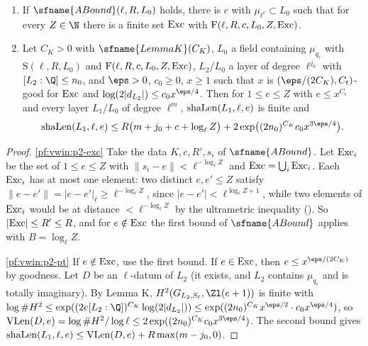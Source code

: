 \begin{lemma}\label{pf:vwin:point2}
\begin{enumerate}[label=(\alph*)]
\item\label{pf:vwin:p2-exc} If $\sfname{ABound}(\ell,R,L_0)$ holds, there is $c$ with $\mu_{\ell^c}\subset L_0$ such that for every
$Z\in\N$ there is a finite set $\mathrm{Exc}$ with $\mathrm{F}(\ell,R,c,L_0,Z,\mathrm{Exc})$.
\item\label{pf:vwin:p2-pt} Let $C_K>0$ with $\sfname{LemmaK}(C_K)$, $L_0$ a field containing $\mu_{q_\ell}$ with
$\mathrm{S}(\ell,R,L_0)$ and $\mathrm{F}(\ell,R,c,L_0,Z,\mathrm{Exc})$, $L_2/L_0$ a layer of degree $\ell^{j_0}$ with $[L_2:\Q]\le n_0$, and
$\eps>0$, $c_0\ge0$, $x\ge1$ such that $x$ is $(\eps/(2C_K),C_t)$-good for $\mathrm{Exc}$ and $\log(2|d_{L_2}|)\le c_0x^{\eps/4}$.
Then for $1\le e\le Z$ with $e\le x^{C_t}$ and every layer $L_1/L_0$ of degree $\ell^m$, $\mathrm{shaLen}(L_1,\ell,e)$ is finite and
\[
 \vwinsh(L_1,\ell,e)\le R\bigl(m+j_0+c+\log_\ell Z\bigr)+2\exp\bigl((2n_0)^{C_K}c_0x^{3\eps/4}\bigr).
\]
\end{enumerate}
\end{lemma}

\begin{proof}
\ref{pf:vwin:p2-exc} Take the data $K,c,R',s_i$ of $\sfname{ABound}$. Let $\mathrm{Exc}_i$ be the set of $1\le e\le Z$ with
$\|s_i-e\|<\ell^{-\log_\ell Z}$ and $\mathrm{Exc}=\bigcup_i\mathrm{Exc}_i$. Each $\mathrm{Exc}_i$ has at most one element: two distinct
$e,e'\le Z$ satisfy $\|e-e'\|=|e-e'|_\ell\ge\ell^{-\log_\ell Z}$, since $|e-e'|<\ell^{\log_\ell Z+1}$, while two elements of
$\mathrm{Exc}_i$ would be at distance $<\ell^{-\log_\ell Z}$ by the ultrametric inequality (). So
$|\mathrm{Exc}|\le R'\le R$, and for $e\notin\mathrm{Exc}$ the first bound of $\sfname{ABound}$ applies with $B=\log_\ell Z$.

\ref{pf:vwin:p2-pt} If $e\notin\mathrm{Exc}$, use the first bound. If $e\in\mathrm{Exc}$, then $e\le x^{\eps/(2C_K)}$ by goodness. Let $D$ be an
$\ell$-datum of $L_2$ (it exists, and $L_2$ contains $\mu_{q_\ell}$ and is totally imaginary). By Lemma K, $H^2(G_{L_2,S_\ell},\Zl(e+1))$
is finite with $\log\#H^2\le\exp((2e[L_2:\Q])^{C_K}\log(2|d_{L_2}|))\le\exp((2n_0)^{C_K}x^{\eps/2}\cdot c_0x^{\eps/4})$, so
$\vwinVL(D,e)=\log\#H^2/\log\ell\le2\exp((2n_0)^{C_K}c_0x^{3\eps/4})$. The second bound gives
$\mathrm{shaLen}(L_1,\ell,e)\le\mathrm{VLen}(D,e)+R\max(m-j_0,0)$.
\end{proof}

